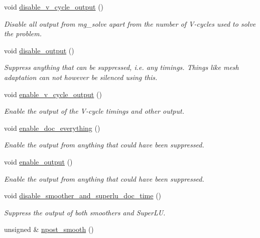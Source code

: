 \begin{DoxyCompactItemize}
void \hyperlink{classoomph_1_1MGSolver_aa96a2b512287d603f3be8fb1c693e05a}{disable\+\_\+v\+\_\+cycle\+\_\+output} ()
\begin{DoxyCompactList}\small\item\em Disable all output from mg\+\_\+solve apart from the number of V-\/cycles used to solve the problem. \end{DoxyCompactList}\item 
void \hyperlink{classoomph_1_1MGSolver_a72dcbb3e6fd8420e7236ada2b5e33b91}{disable\+\_\+output} ()
\begin{DoxyCompactList}\small\item\em Suppress anything that can be suppressed, i.\+e. any timings. Things like mesh adaptation can not however be silenced using this. \end{DoxyCompactList}\item 
void \hyperlink{classoomph_1_1MGSolver_a34098c30d954bc884b7df62ec61bd836}{enable\+\_\+v\+\_\+cycle\+\_\+output} ()
\begin{DoxyCompactList}\small\item\em Enable the output of the V-\/cycle timings and other output. \end{DoxyCompactList}\item 
void \hyperlink{classoomph_1_1MGSolver_ac1e06a4689b41bbb9a05ba9a0eecdb23}{enable\+\_\+doc\+\_\+everything} ()
\begin{DoxyCompactList}\small\item\em Enable the output from anything that could have been suppressed. \end{DoxyCompactList}\item 
void \hyperlink{classoomph_1_1MGSolver_abf5d8dc2a2a116a41bb625e1d6985f2e}{enable\+\_\+output} ()
\begin{DoxyCompactList}\small\item\em Enable the output from anything that could have been suppressed. \end{DoxyCompactList}\item 
void \hyperlink{classoomph_1_1MGSolver_a84a562088ef3ec0514027cac6a69d5a9}{disable\+\_\+smoother\+\_\+and\+\_\+superlu\+\_\+doc\+\_\+time} ()
\begin{DoxyCompactList}\small\item\em Suppress the output of both smoothers and Super\+LU. \end{DoxyCompactList}\item 
unsigned \& \hyperlink{classoomph_1_1MGSolver_a7ccbf719e57fb651fa4577c13b90942b}{npost\+\_\+smooth} ()

\end{DoxyCompactItemize}
